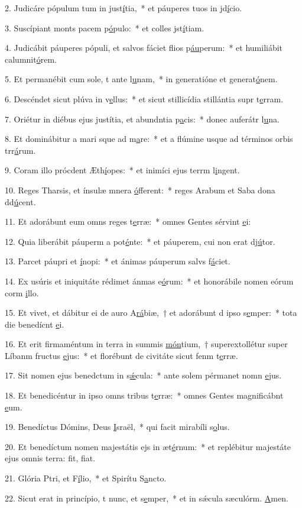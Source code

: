 2. Judicáre pópulum tum in just\uline{í}tia,~* et páuperes tuos in jd\uline{í}cio.\par 
3. Suscípiant monts pacem p\uline{ó}pulo:~* et colles jst\uline{í}tiam.\par 
4. Judicábit páuperes pópuli, et salvos fáciet flios p\uline{áu}perum:~* et humiliábit calumnit\uline{ó}rem.\par 
5. Et permanébit cum sole, t ante l\uline{u}nam,~* in generatióne et generat\uline{ó}nem.\par 
6. Descéndet sicut plúva in v\uline{e}llus:~* et sicut stillicídia stillántia supr t\uline{e}rram.\par 
7. Oriétur in diébus ejus justítia, et abundntia p\uline{a}cis:~* donec auferátr l\uline{u}na.\par 
8. Et dominábitur a mari sque ad m\uline{a}re:~* et a flúmine usque ad términos orbis trr\uline{á}rum.\par 
9. Coram illo prócdent Æth\uline{í}opes:~* et inimíci ejus terrm l\uline{i}ngent.\par 
10. Reges Tharsis, et ínsulæ mnera \uline{ó}fferent:~* reges Arabum et Saba dona dd\uline{ú}cent.\par 
11. Et adorábunt eum omns reges t\uline{e}rræ:~* omnes Gentes sérvint \uline{e}i:\par 
12. Quia liberábit páuperm a pot\uline{é}nte:~* et páuperem, cui non erat dj\uline{ú}tor.\par 
13. Parcet páupri et \uline{í}nopi:~* et ánimas páuperum salvs f\uline{á}ciet.\par 
14. Ex usúris et iniquitáte rédimet ánmas e\uline{ó}rum:~* et honorábile nomen eórum corm \uline{i}llo.\par 
15. Et vivet, et dábitur ei de auro A\uline{rá}biæ,~† et adorábunt d ipso s\uline{e}mper:~* tota die benedícnt \uline{e}i.\par 
16. Et erit firmaméntum in terra in summis \uline{món}tium,~† superextollétur super Líbanm fructus \uline{e}jus:~* et florébunt de civitáte sicut fenm t\uline{e}rræ.\par 
17. Sit nomen ejus benedctum in s\uline{ǽ}cula:~* ante solem pérmanet nomn \uline{e}jus.\par 
18. Et benedicéntur in ipso omns tribus t\uline{e}rræ:~* omnes Gentes magnificábnt \uline{e}um.\par 
19. Benedíctus Dómins, Deus \uline{I}sraël,~* qui facit mirabíli s\uline{o}lus.\par 
20. Et benedíctum nomen majestátis ejs in æt\uline{é}rnum:~* et replébitur majestáte ejus omnis terra: fit, f\uline{i}at.\par 
21. Glória Ptri, et F\uline{í}lio,~* et Spirítu S\uline{a}ncto.\par 
22. Sicut erat in princípio, t nunc, et s\uline{e}mper,~* et in sǽcula sæculórm. \uline{A}men.\par 
